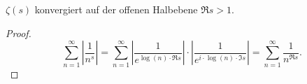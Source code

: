 \begin{frame}
    \begin{lemma}[Konvergenzgebiet]
        $\zeta(s)$ konvergiert auf der offenen Halbebene $\Re s > 1$.
    \end{lemma}
    \begin{proof}
    \[\sum_{n=1}^\infty \left|\frac{1}{n^s}\right| =  \sum_{n=1}^\infty \left|\frac{1}{e^{\log(n)\cdot \Re s}}\right| \cdot \left|\frac{1}{e^{i \cdot \log(n) \cdot \Im s}}\right| = \sum_{n=1}^\infty \frac{1}{n^{\Re s}}.\] 
    \end{proof}

\end{frame}